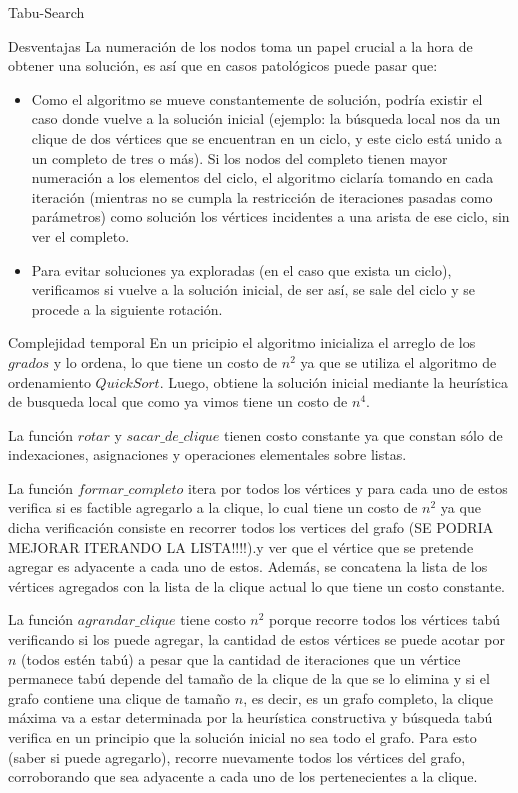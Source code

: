 \begin{section}{Tabu-Search}
	\begin{subsection}{Desventajas}
		La numeración de los nodos toma un papel crucial a la hora de obtener una solución, es así que en casos patológicos puede pasar que:
		\begin{itemize}
			\item Como el algoritmo se mueve constantemente de solución, podría existir el caso donde vuelve a la solución inicial (ejemplo: la búsqueda local nos da un clique de dos vértices que se encuentran en un ciclo, y este ciclo está unido a un completo de tres o más). Si los nodos del completo tienen mayor numeración a los elementos del ciclo, el algoritmo ciclaría tomando en cada iteración (mientras no se cumpla la restricción de iteraciones pasadas como parámetros) como solución los vértices incidentes a una arista de ese ciclo, sin ver el completo.
			\item Para evitar soluciones ya exploradas (en el caso que exista un ciclo), verificamos si vuelve a la solución inicial, de ser así, se sale del ciclo y se procede a la siguiente rotación.
		\end{itemize}
	
	\end{subsection}

	\begin{subsection}{Complejidad temporal}
			En un pricipio el algoritmo inicializa el arreglo de los $grados$ y lo ordena, lo que tiene un costo de $n^2$ ya que se utiliza el algoritmo de ordenamiento $QuickSort$. Luego, obtiene la solución inicial mediante la heurística de busqueda local que como ya vimos tiene un costo de $n^4$.

			La función $rotar$ y $sacar\_de\_clique$ tienen costo constante ya que constan sólo de indexaciones, asignaciones y operaciones elementales sobre listas.

			La función $formar\_completo$ itera por todos los vértices y para cada uno de estos verifica si es factible agregarlo a la clique, lo cual tiene un costo de $n^2$ ya que dicha verificación consiste en recorrer todos los vertices del grafo (SE PODRIA MEJORAR ITERANDO LA LISTA!!!!).y ver que el vértice que se pretende agregar es adyacente a cada uno de estos. Además, se concatena la lista de los vértices agregados con la lista de la clique actual lo que tiene un costo constante.

			La función $agrandar\_clique$ tiene costo $n^2$ porque recorre todos los vértices tabú verificando si los puede agregar, la cantidad de estos vértices se puede acotar por $n$ (todos estén tabú) a pesar que la cantidad de iteraciones que un vértice permanece tabú depende del tamaño de la clique de la que se lo elimina y si el grafo contiene una clique de tamaño $n$, es decir, es un grafo completo, la clique máxima va a estar  determinada por la heurística constructiva y búsqueda tabú verifica en un principio que la solución inicial no sea todo el grafo. Para esto (saber si puede agregarlo), recorre nuevamente todos los vértices del grafo, corroborando que sea adyacente a cada uno de los pertenecientes a la clique.


\end{subsection}
\end{section}

